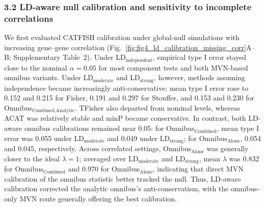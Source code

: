 \documentclass[unnumsec,webpdf,contemporary,large]{oup-authoring-template}%
\theoremstyle{thmstyleone}%
\theoremstyle{thmstyletwo}%
\theoremstyle{thmstylethree}%
\begin{document}


\subsubsection{3.2 LD-aware null calibration and sensitivity to incomplete correlations}

We first evaluated CATFISH calibration under global-null simulations with increasing gene–gene correlation (Fig.~\ref{fig:fig4_ld_calibration_missing_corr}A–B; Supplementary Table~2). Under LD\(_\text{independent}\), empirical type I error stayed close to the nominal \(\alpha=0.05\) for most component tests and both MVN-based omnibus variants. Under LD\(_\text{moderate}\) and LD\(_\text{strong}\), however, methods assuming independence became increasingly anti-conservative: mean type I error rose to 0.152 and 0.215 for Fisher, 0.191 and 0.297 for Stouffer, and 0.153 and 0.230 for Omnibus\(_\text{Combined,Analytic}\). TFisher also departed from nominal levels, whereas ACAT was relatively stable and minP became conservative. In contrast, both LD-aware omnibus calibrations remained near 0.05: for Omnibus\(_\text{Combined}\), mean type I error was 0.055 under LD\(_\text{moderate}\) and 0.049 under LD\(_\text{strong}\); for Omnibus\(_\text{Alone}\), 0.054 and 0.045, respectively. Across correlated settings, Omnibus\(_\text{Alone}\) was generally closer to the ideal \(\lambda=1\); averaged over LD\(_\text{moderate}\) and LD\(_\text{strong}\), mean \(\lambda\) was 0.832 for Omnibus\(_\text{Combined}\) and 0.970 for Omnibus\(_\text{Alone}\), indicating that direct MVN calibration of the omnibus statistic better tracked the null. Thus, LD-aware calibration corrected the analytic omnibus’s anti-conservatism, with the omnibus-only MVN route generally offering the best calibration.
\end{document}
